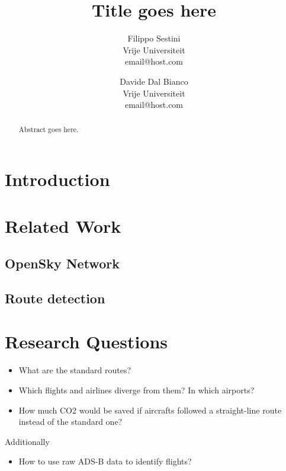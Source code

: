 \documentclass{vldb}
\title{Title goes here}
\author{Filippo Sestini \\ Vrije Universiteit \\ email@host.com \and
  Davide Dal Bianco \\ Vrije Universiteit \\ email@host.com}
\begin{document}
\maketitle

\begin{abstract}
Abstract goes here.  
\end{abstract}

\section{Introduction}

\section{Related Work}

\subsection{OpenSky Network}

\subsection{Route detection}

\section{Research Questions}

\begin{itemize}
  \item What are the standard routes?
  \item Which flights and airlines diverge from them? In which airports?
  \item How much CO2 would be saved if aircrafts followed a straight-line route
  instead of the standard one?
\end{itemize}

Additionally

\begin{itemize}
  \item How to use raw ADS-B data to identify flights?
\end{itemize}
\end{document}
